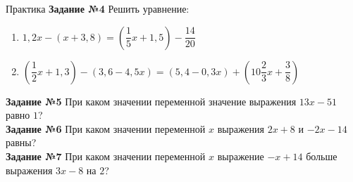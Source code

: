\documentclass[12pt, aspectratio=169]{beamer}
\begin{document}
\begin{frame}{Практика}
	\textbf{Задание №4} Решить уравнение:
	\begin{enumerate}
		\item $1,2x-(x+3,8)=(\dfrac{1}{5}x+1,5)-\dfrac{14}{20}$
		\item $(\dfrac{1}{2}x+1,3)-(3,6-4,5x)=(5,4-0,3x)+(10\dfrac{2}{3}x+\dfrac{3}{8})$
	\end{enumerate}
	
	\textbf{Задание №5} При каком значении переменной значение выражения $13x-51$ равно $1$?\\
	
	\textbf{Задание №6} При каком значении переменной $x$ выражения $2x+8$ и $-2x-14$ равны?\\
	
	\textbf{Задание №7} При каком значении переменной $x$ выражение $-x+14$ больше выражения $3x-8$ на $2$?
\end{frame}
\end{document}

